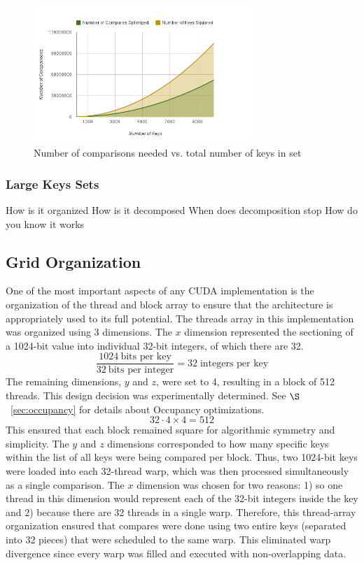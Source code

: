 \documentclass[smallextended]{svjour3}       %
\begin{document}
\begin{figure}
   \centering
   \includegraphics[width=0.75\textwidth]{chart_6}
   \caption{Number of comparisons needed vs. total number of keys in set}
   \label{fig:compvkeys}
\end{figure}

\subsubsection{Large Keys Sets}
\label{subsubsec:largesets}
How is it organized
How is it decomposed
When does decomposition stop
How do you know it works

\subsection{Grid Organization}
\label{sec:gridorg}
One of the most important aspects of any CUDA implementation is the 
organization of the thread and block array to ensure that the architecture is 
appropriately used to its full potential. The threads array in this 
implementation was organized using 3 dimensions. The $x$ dimension represented 
the sectioning of a 1024-bit value into individual 32-bit integers, of which 
there are 32. 
\begin{displaymath}
   \frac{1024 \:\mbox{bits per key}}{32 \:\mbox{bits per integer}} = 
   32 \;\mbox{integers per key}
\end{displaymath}
The remaining dimensions, $y$ and $z$, were set to 4, resulting in a block of 
512 threads. This design decision was experimentally determined. See 
$\S$~\ref{sec:occupancy} for details about Occupancy optimizations.
\begin{displaymath}
   32 \cdot 4 \times 4 = 512
\end{displaymath}
This ensured that each block remained square for algorithmic 
symmetry and simplicity. The $y$ and $z$ dimensions corresponded to how many 
specific keys within the list of all keys were being compared per block. 
Thus, two 1024-bit keys were loaded into each 32-thread warp, which was 
then processed simultaneously as a single comparison. The $x$ dimension was 
chosen for two reasons: 1) so one thread in this dimension would represent 
each of the 32-bit integers inside the key and 2) because there are 32 threads 
in a single warp. Therefore, this thread-array organization ensured that 
compares were done using two entire keys (separated into 32 pieces) that were 
scheduled to the same warp. This eliminated warp divergence since every warp 
was filled and executed with non-overlapping data.
\end{document}
